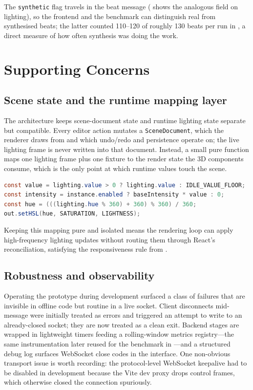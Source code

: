 The \texttt{synthetic} flag travels in the beat message ( shows the analogous field on lighting), so the frontend and the benchmark can distinguish real from synthesised beats; the latter counted 110--120 of roughly 130 beats per run in , a direct measure of how often synthesis was doing the work.

\section{Supporting Concerns}
\label{sec:impl-supporting}

\subsection{Scene state and the runtime mapping layer}

The architecture keeps scene-document state and runtime lighting state separate but compatible. Every editor action mutates a \texttt{SceneDocument}, which the renderer draws from and which undo/redo and persistence operate on; the live lighting frame is never written into that document. Instead, a small pure function maps one lighting frame plus one fixture to the render state the 3D components consume, which is the only point at which runtime values touch the scene.

\begin{lstlisting}[language=Java,caption={The single mapping point from runtime lighting to fixture render state (TypeScript). An idle floor keeps enabled fixtures visible before the first prediction.},label={lst:map-frame}]
const value = lighting.value > 0 ? lighting.value : IDLE_VALUE_FLOOR;
const intensity = instance.enabled ? baseIntensity * value : 0;
const hue = (((lighting.hue % 360) + 360) % 360) / 360;
out.setHSL(hue, SATURATION, LIGHTNESS);
\end{lstlisting}

Keeping this mapping pure and isolated means the rendering loop can apply high-frequency lighting updates without routing them through React's reconciliation, satisfying the responsiveness rule from .

\subsection{Robustness and observability}

Operating the prototype during development surfaced a class of failures that are invisible in offline code but routine in a live socket. Client disconnects mid-message were initially treated as errors and triggered an attempt to write to an already-closed socket; they are now treated as a clean exit. Backend stages are wrapped in lightweight timers feeding a rolling-window metrics registry---the same instrumentation later reused for the benchmark in ---and a structured debug log surfaces WebSocket close codes in the interface. One non-obvious transport issue is worth recording: the protocol-level WebSocket keepalive had to be disabled in development because the Vite dev proxy drops control frames, which otherwise closed the connection spuriously.

